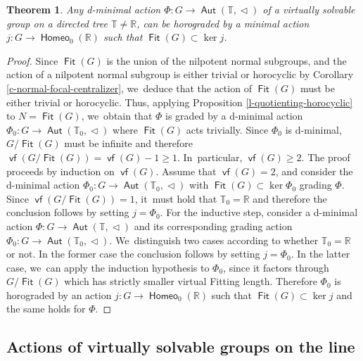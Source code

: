 \documentclass[JEP,XML,SOM,Unicode,NoFloatCountersInSection,published]{cedram}
\newtheorem{thm}{Theorem}[section]
\theoremstyle{definition}
\DeclareMathOperator{\Aut}{\mathsf{Aut}}
\DeclareMathOperator{\Fit}{\mathsf{Fit}}
\DeclareMathOperator{\homeo}{\mathsf{Homeo}}
\DeclareMathOperator{\vf}{\mathsf{vf}}
\newcommand{\R}{\mathbb{R}}
\newcommand{\Tbb}{\mathbb T}
\newcommand{\treeorder}{\mathrel{\triangleleft}}
\begin{document}
\begin{thm}\label{t-solvable-inductive}
Any d-minimal action $\Phi\colon G\to \Aut(\Tbb, \treeorder)$ of a virtually solvable group on a directed tree $\Tbb\neq \R$, can be horograded by a minimal action $j\colon G\to \homeo_0(\R)$ such that $\Fit(G)\subset \ker j$.
\end{thm}

\begin{proof} Since $\Fit(G)$ is the union of the nilpotent normal subgroups, and the action of a nilpotent normal subgroup is either trivial or horocyclic by Corollary \ref{c-normal-focal-centralizer}, we~deduce that the action of $\Fit(G)$ must be either trivial or horocyclic. Thus, applying Proposition \ref{l-quotienting-horocyclic} to $N=\Fit(G)$, we~obtain that $\Phi$ is graded by a d-minimal action $\Phi_0\colon G\to \Aut(\Tbb_0, \treeorder)$ where $\Fit(G)$ acts trivially. Since $\Phi_0$ is d-minimal, $G/\Fit(G)$ must be infinite and therefore $\vf(G/\Fit(G))=\vf(G)-1\geq 1$. In~particular, $\vf(G)\geq 2$. The proof proceeds by induction on $\vf(G)$. Assume that $\vf(G)=2$, and consider the d-minimal action $\Phi_0\colon G\to\Aut(\Tbb_0,\treeorder)$ with $\Fit(G)\subset\ker \Phi _0$ grading $\Phi $. Since $\vf(G/\Fit(G))=1$, it~must hold that $\Tbb_0=\R$ and therefore the conclusion follows by setting $j=\Phi_0$. For the inductive step, consider a d-minimal action $\Phi\colon G\to\Aut(\Tbb,\treeorder)$ and its corresponding grading action $\Phi _0\colon G\to\Aut(\Tbb_0,\treeorder)$. We~distinguish two cases according to whether $\Tbb_0=\R$ or not. In the former case the conclusion follows by setting $j=\Phi _0$. In the latter case, we~can apply the induction hypothesis to $\Phi _0$, since it factors through $G/\Fit(G)$ which has strictly smaller virtual Fitting length. Therefore $\Phi _0$ is horograded by an action $j\colon G\to \homeo_0(\R)$ such that $\Fit(G)\subset \ker j$ and the same holds for $\Phi$.
\end{proof}

\subsection{Actions of virtually solvable groups on the line}
\end{document}
